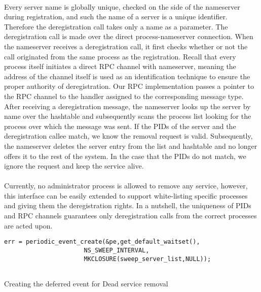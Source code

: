 \paragraph{}
Every server name is globally unique, checked on the side of the nameserver during registration, and such the name of a server is a unique identifier. Therefore the deregistration call takes only a name as a parameter. The deregistration call is made over the direct process-nameserver connection. When the nameserver receives a deregistration call, it first checks whether or not the call originated from the same process as the registration. Recall that every process itself initiates a direct RPC channel with nameserver, meaning the address of the  channel itself is used as an identification technique to ensure the proper authority of deregistration. Our RPC implementation passes a pointer to the RPC channel to the handler assigned to the corresponding message type. After receiving a deregistration message, the nameserver looks up the server by name over the hashtable and subsequently scans the process list looking for the process over which the message was sent. If the PIDs of the server and the deregistration callee match, we know the removal request is valid. Subsequently, the nameserver deletes the server entry from the list and hashtable and no longer offers it to the rest of the system. In the case that the PIDs do not match, we ignore the request and keep the service alive. 
\paragraph{}
Currently, no administrator process is allowed to remove any service, however, this interface can be easily extended to support white-listing specific processes and giving them the deregistration rights. In a nutshell, the uniqueness of PIDs and RPC channels guarantees only deregistration calls from the correct processes are acted upon.
\begin{code}
\begin{mdframed}[style=myframe]
\begin{verbatim}
err = periodic_event_create(&pe,get_default_waitset(),
                      NS_SWEEP_INTERVAL,
                      MKCLOSURE(sweep_server_list,NULL));
                      
\end{verbatim}
\end{mdframed}
\caption{Creating the deferred event for Dead service removal}
\newline
\label{code:sweep_registration}
\end{code}


